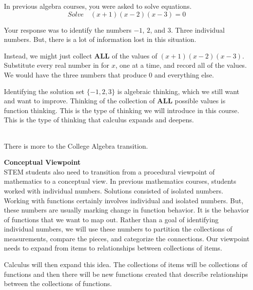 \documentclass{ximera}
\begin{document}
\begin{idea}
In previous algebra courses, you were asked to solve equations.
\[
Solve \quad (x+1)(x-2)(x-3) = 0
\]

Your response was to identify the numbers $-1$, $2$, and $3$. Three individual numbers. But, there is a lot of information lost in this situation.

Instead, we might just collect \textbf{ALL} of the values of $(x+1)(x-2)(x-3)$.  Substitute every real number in for $x$, one at a time, and record all of the values. We would have the three numbers that produce $0$ and everything else.

Identifying the solution set $\{ -1, 2, 3 \}$ is algebraic thinking, which we still want and want to improve.  Thinking of the collection of \textbf{ALL} possible values is function thinking.  This is the type of thinking we will introduce in this course.  This is the type of thinking that calculus expands and deepens.

\end{idea}


\\ 
There is more to the College Algebra transition.








\textbf{Conceptual Viewpoint} \\
STEM students also need to transition from a procedural viewpoint of mathematics to a conceptual view. In previous mathematics courses, students worked with individual numbers. Solutions consisted of isolated numbers. Working with functions certainly involves individual and isolated numbers. But, these numbers are usually marking change in function behavior. It is the behavior of functions that we want to map out. Rather than a goal of identifying individual numbers, we will use these numbers to partition the collections of measurements, compare the pieces, and categorize the connections. Our viewpoint needs to expand from items to relationships between collections of items.

Calculus will then expand this idea.  The collections of items will be collections of functions and then there will be new functions created that describe relationships between the collections of functions.
\end{document}

